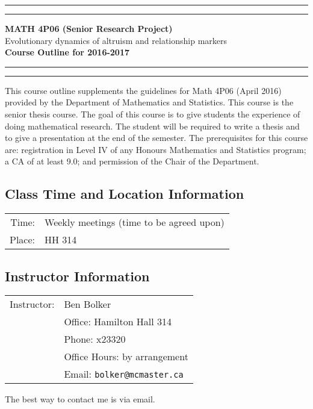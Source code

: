\documentclass[10pt,oneside]{amsart}
\begin{document}
\hrule
\vspace{.1cm}

\hrule
\vspace{.1cm}

\begin{center}
{\bf
MATH 4P06 (Senior Research Project)} \\
Evolutionary dynamics of altruism and relationship markers \\
{\bf Course Outline for 2016-2017}
\end{center}

\hrule
\vspace{.1cm}

\hrule
\vspace{.5cm}

\noindent
This course outline supplements the guidelines for Math 4P06 (April 2016) 
provided by
the Department of Mathematics and Statistics.
This course is the senior thesis course.  The goal of this course
is to give students the experience of doing mathematical research.
The student will be required to write a thesis
and to give a presentation at the end of the semester.  
The prerequisites for this course are: registration in 
Level IV of any Honours Mathematics and Statistics program;
a CA of at least 9.0; and permission of the Chair of the Department.


\subsection*{Class Time and Location Information}

\begin{center}
\begin{tabular}{rp{12cm}}
Time: & Weekly meetings (time to be agreed upon) \\
Place: & HH 314
\end{tabular}
\end{center}

\noindent
\subsection*{Instructor Information}

\begin{center}
\begin{tabular}{rp{12cm}}
Instructor: & Ben Bolker \\
 & Office: Hamilton Hall 314 \\
 & Phone: x23320 \\
 & Office Hours: by arrangement \\
 & Email: {\tt bolker@mcmaster.ca} \\
\end{tabular}
\end{center}
The best way to contact
me is via email.
\end{document}
